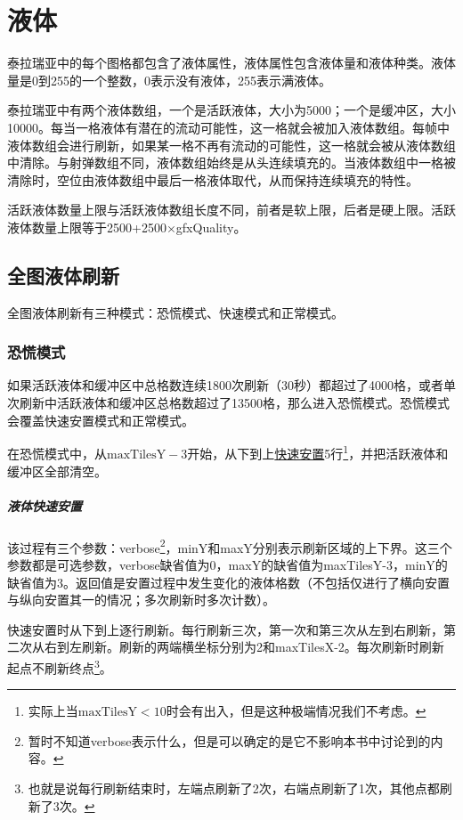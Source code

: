 \chapter{液体}\label{app23}

泰拉瑞亚中的每个图格都包含了液体属性，液体属性包含液体量和液体种类。液体量是0到255的一个整数，0表示没有液体，255表示满液体。

泰拉瑞亚中有两个液体数组，一个是活跃液体，大小为5000；一个是缓冲区，大小10000。每当一格液体有潜在的流动可能性，这一格就会被加入液体数组。每帧中液体数组会进行刷新，如果某一格不再有流动的可能性，这一格就会被从液体数组中清除。与射弹数组不同，液体数组始终是从头连续填充的。当液体数组中一格被清除时，空位由液体数组中最后一格液体取代，从而保持连续填充的特性。

活跃液体数量上限与活跃液体数组长度不同，前者是软上限，后者是硬上限。活跃液体数量上限等于2500+2500$\times$gfxQuality。

\section{全图液体刷新}
全图液体刷新有三种模式：恐慌模式、快速模式和正常模式。

\subsection{恐慌模式}
如果活跃液体和缓冲区中总格数连续1800次刷新（30秒）都超过了4000格，或者单次刷新中活跃液体和缓冲区总格数超过了13500格，那么进入恐慌模式。恐慌模式会覆盖快速安置模式和正常模式。

在恐慌模式中，从$\textrm{maxTilesY}-3$开始，从下到上\hyperref[app25]{快速安置}5行\footnote{实际上当$\textrm{maxTilesY}<10$时会有出入，但是这种极端情况我们不考虑。}，并把活跃液体和缓冲区全部清空。

\paragraph*{液体快速安置}\label{app25}
该过程有三个参数：verbose\footnote{暂时不知道verbose表示什么，但是可以确定的是它不影响本书中讨论到的内容。}，minY和maxY分别表示刷新区域的上下界。这三个参数都是可选参数，verbose缺省值为0，maxY的缺省值为maxTilesY-3，minY的缺省值为3。返回值是安置过程中发生变化的液体格数（不包括仅进行了横向安置与纵向安置其一的情况；多次刷新时多次计数）。

快速安置时从下到上逐行刷新。每行刷新三次，第一次和第三次从左到右刷新，第二次从右到左刷新。刷新的两端横坐标分别为2和maxTilesX-2。每次刷新时刷新起点不刷新终点\footnote{也就是说每行刷新结束时，左端点刷新了2次，右端点刷新了1次，其他点都刷新了3次。}。

